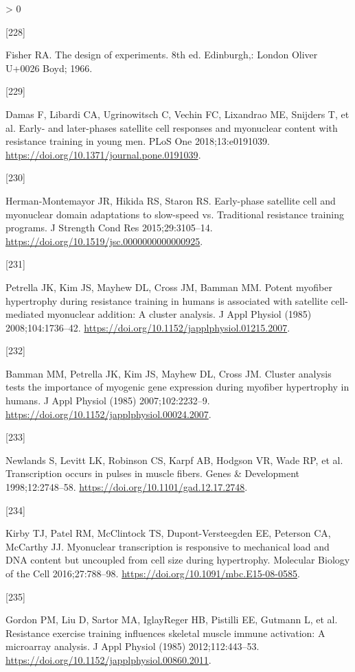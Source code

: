 \documentclass[twoside,10pt]{gihclass} %
\newlength{\cslhangindent}
\newlength{\csllabelwidth}
\newenvironment{CSLReferences}[3] %
 {%
  \setlength{\parindent}{0pt}
  \ifodd #1 \everypar{\setlength{\hangindent}{\cslhangindent}}\ignorespaces\fi
  \ifnum #2 > 0
  \setlength{\parskip}{#2\baselineskip}
  \fi
 }%
 {}
\newcommand{\CSLLeftMargin}[1]{\parbox[t]{\maxof{\widthof{#1}}{\csllabelwidth}}{#1}}
\newcommand{\CSLRightInline}[1]{\parbox[t]{\linewidth}{#1}}
\begin{document}
\begin{CSLReferences}{0}{0}
\leavevmode\hypertarget{ref-RN2004}{}%
\CSLLeftMargin{{[}228{]} }
\CSLRightInline{Fisher RA. The design of experiments. 8th ed. Edinburgh,: London Oliver U+0026 Boyd; 1966.}

\leavevmode\hypertarget{ref-RN2112}{}%
\CSLLeftMargin{{[}229{]} }
\CSLRightInline{Damas F, Libardi CA, Ugrinowitsch C, Vechin FC, Lixandrao ME, Snijders T, et al. Early- and later-phases satellite cell responses and myonuclear content with resistance training in young men. PLoS One 2018;13:e0191039. \url{https://doi.org/10.1371/journal.pone.0191039}.}

\leavevmode\hypertarget{ref-RN2874}{}%
\CSLLeftMargin{{[}230{]} }
\CSLRightInline{Herman-Montemayor JR, Hikida RS, Staron RS. Early-phase satellite cell and myonuclear domain adaptations to slow-speed vs. Traditional resistance training programs. J Strength Cond Res 2015;29:3105--14. \url{https://doi.org/10.1519/jsc.0000000000000925}.}

\leavevmode\hypertarget{ref-RN2868}{}%
\CSLLeftMargin{{[}231{]} }
\CSLRightInline{Petrella JK, Kim JS, Mayhew DL, Cross JM, Bamman MM. Potent myofiber hypertrophy during resistance training in humans is associated with satellite cell-mediated myonuclear addition: A cluster analysis. J Appl Physiol (1985) 2008;104:1736--42. \url{https://doi.org/10.1152/japplphysiol.01215.2007}.}

\leavevmode\hypertarget{ref-RN765}{}%
\CSLLeftMargin{{[}232{]} }
\CSLRightInline{Bamman MM, Petrella JK, Kim JS, Mayhew DL, Cross JM. Cluster analysis tests the importance of myogenic gene expression during myofiber hypertrophy in humans. J Appl Physiol (1985) 2007;102:2232--9. \url{https://doi.org/10.1152/japplphysiol.00024.2007}.}

\leavevmode\hypertarget{ref-RN2618}{}%
\CSLLeftMargin{{[}233{]} }
\CSLRightInline{Newlands S, Levitt LK, Robinson CS, Karpf AB, Hodgson VR, Wade RP, et al. Transcription occurs in pulses in muscle fibers. Genes \& Development 1998;12:2748--58. \url{https://doi.org/10.1101/gad.12.17.2748}.}

\leavevmode\hypertarget{ref-RN2616}{}%
\CSLLeftMargin{{[}234{]} }
\CSLRightInline{Kirby TJ, Patel RM, McClintock TS, Dupont-Versteegden EE, Peterson CA, McCarthy JJ. Myonuclear transcription is responsive to mechanical load and DNA content but uncoupled from cell size during hypertrophy. Molecular Biology of the Cell 2016;27:788--98. \url{https://doi.org/10.1091/mbc.E15-08-0585}.}

\leavevmode\hypertarget{ref-RN1825}{}%
\CSLLeftMargin{{[}235{]} }
\CSLRightInline{Gordon PM, Liu D, Sartor MA, IglayReger HB, Pistilli EE, Gutmann L, et al. Resistance exercise training influences skeletal muscle immune activation: A microarray analysis. J Appl Physiol (1985) 2012;112:443--53. \url{https://doi.org/10.1152/japplphysiol.00860.2011}.}


\end{CSLReferences}
\end{document}
